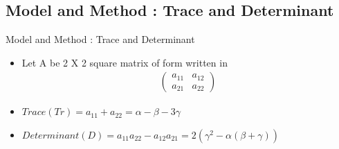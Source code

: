 \documentclass[smaller,aspectratio=169, toc=bibliography]{beamer}
\begin{document}
\subsection*{Model and Method : Trace and Determinant}
\begin{frame}[fragile]{Model and Method : Trace and Determinant}
\begin{itemize}

\item Let A be 2 X 2 square matrix of form written in  
\begin{equation*}
\label{generalsubmatrix}
\begin{aligned}
	\left(\begin{array}{rr}
		a_{11} & a_{12} \\
		a_{21} & a_{22}
		\end{array}\right)
\end{aligned}
\end{equation*}
\item $Trace(Tr) = a_{11} + a_{22} = \alpha - \beta - 3\gamma $
\\
\item $Determinant(D) = a_{11}a_{22} - a_{12}a_{21} = 2(\gamma^2 - \alpha(\beta + \gamma)) $ 


\end{itemize}
\end{frame}
\end{document}
